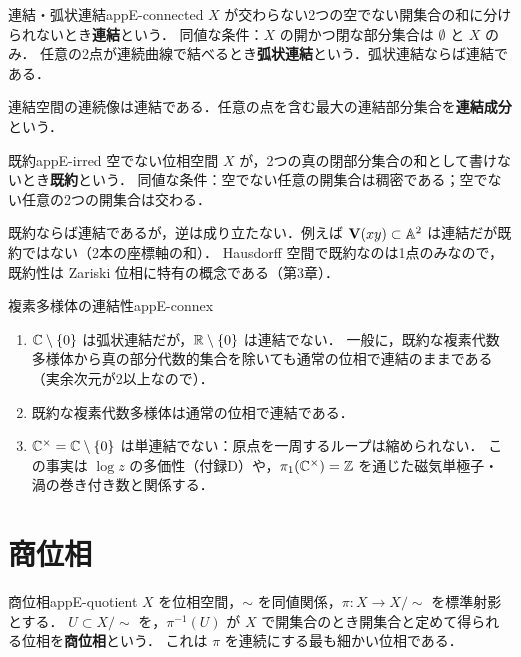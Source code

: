 \begin{mydef}{連結・弧状連結}{appE-connected}
$X$ が交わらない2つの空でない開集合の和に分けられないとき\textbf{連結}という．
同値な条件：$X$ の開かつ閉な部分集合は $\emptyset$ と $X$ のみ．
任意の2点が連続曲線で結べるとき\textbf{弧状連結}という．弧状連結ならば連結である．
\end{mydef}

連結空間の連続像は連結である．任意の点を含む最大の連結部分集合を\textbf{連結成分}という．

\begin{mydef}{既約}{appE-irred}
空でない位相空間 $X$ が，2つの真の閉部分集合の和として書けないとき\textbf{既約}という．
同値な条件：空でない任意の開集合は稠密である；空でない任意の2つの開集合は交わる．
\end{mydef}

既約ならば連結であるが，逆は成り立たない．例えば $\mathbf{V}(xy)\subset\mathbb{A}^2$ は連結だが既約ではない（2本の座標軸の和）．
Hausdorff 空間で既約なのは1点のみなので，既約性は Zariski 位相に特有の概念である（第3章）．

\begin{myex}{複素多様体の連結性}{appE-connex}
\begin{enumerate}
\item $\mathbb{C}\setminus\{0\}$ は弧状連結だが，$\mathbb{R}\setminus\{0\}$ は連結でない．
一般に，既約な複素代数多様体から真の部分代数的集合を除いても通常の位相で連結のままである
（実余次元が2以上なので）．
\item 既約な複素代数多様体は通常の位相で連結である．
\item $\mathbb{C}^\times=\mathbb{C}\setminus\{0\}$ は単連結でない：原点を一周するループは縮められない．
この事実は $\log z$ の多価性（付録D）や，$\pi_1(\mathbb{C}^\times)=\mathbb{Z}$ を通じた磁気単極子・渦の巻き付き数と関係する．
\end{enumerate}
\end{myex}

\section{商位相}

\begin{mydef}{商位相}{appE-quotient}
$X$ を位相空間，$\sim$ を同値関係，$\pi\colon X\to X/{\sim}$ を標準射影とする．
$U\subset X/{\sim}$ を，$\pi^{-1}(U)$ が $X$ で開集合のとき開集合と定めて得られる位相を\textbf{商位相}という．
これは $\pi$ を連続にする最も細かい位相である．
\end{mydef}

